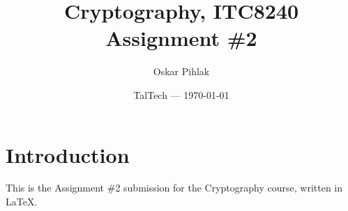 \documentclass{article}
\title{Cryptography, ITC8240 Assignment \#2} %
\author{Oskar Pihlak} %
\date{TalTech --- \today} %
\begin{document}
\maketitle %


\section*{Introduction} %

This is the Assignment \#2 submission for the Cryptography course, written in LaTeX.\\



\end{document}
